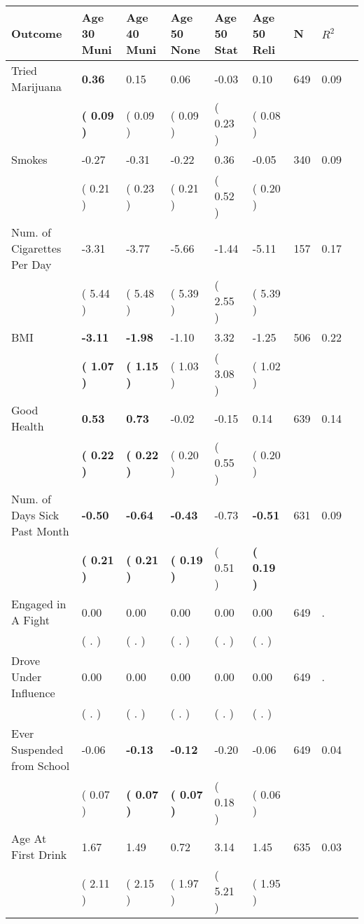 \begin{tabular}{L{6.2cm} C{1.8cm} C{1.8cm} C{1.8cm} C{1.8cm} C{1.8cm} C{1.8cm} C{0.3cm} C{0.3cm}}
\toprule
 \textbf{Outcome} & \textbf{Age 30 Muni} & \textbf{Age 40 Muni} & \textbf{Age 50 None} & \textbf{Age 50 Stat} & \textbf{Age 50 Reli} & \textbf{N} & \textbf{$ R^2$} \\
\midrule
Tried Marijuana & \textbf{     0.36} &      0.15 &      0.06 &     -0.03 &      0.10  & 649 &       0.09 \\ 
 & \textbf{(     0.09 )} & (     0.09 ) & (     0.09 ) & (     0.23 ) & (     0.08 )  & \\
Smokes &     -0.27 &     -0.31 &     -0.22 &      0.36 &     -0.05  & 340 &       0.09 \\ 
 & (     0.21 ) & (     0.23 ) & (     0.21 ) & (     0.52 ) & (     0.20 )  & \\
Num. of Cigarettes Per Day &     -3.31 &     -3.77 &     -5.66 &     -1.44 &     -5.11  & 157 &       0.17 \\ 
 & (     5.44 ) & (     5.48 ) & (     5.39 ) & (     2.55 ) & (     5.39 )  & \\
BMI & \textbf{    -3.11} & \textbf{    -1.98} &     -1.10 &      3.32 &     -1.25  & 506 &       0.22 \\ 
 & \textbf{(     1.07 )} & \textbf{(     1.15 )} & (     1.03 ) & (     3.08 ) & (     1.02 )  & \\
Good Health & \textbf{     0.53} & \textbf{     0.73} &     -0.02 &     -0.15 &      0.14  & 639 &       0.14 \\ 
 & \textbf{(     0.22 )} & \textbf{(     0.22 )} & (     0.20 ) & (     0.55 ) & (     0.20 )  & \\
Num. of Days Sick Past Month & \textbf{    -0.50} & \textbf{    -0.64} & \textbf{    -0.43} &     -0.73 & \textbf{    -0.51}  & 631 &       0.09 \\ 
 & \textbf{(     0.21 )} & \textbf{(     0.21 )} & \textbf{(     0.19 )} & (     0.51 ) & \textbf{(     0.19 )}  & \\
Engaged in A Fight &      0.00 &      0.00 &      0.00 &      0.00 &      0.00  & 649 &          . \\ 
 & (        . ) & (        . ) & (        . ) & (        . ) & (        . )  & \\
Drove Under Influence &      0.00 &      0.00 &      0.00 &      0.00 &      0.00  & 649 &          . \\ 
 & (        . ) & (        . ) & (        . ) & (        . ) & (        . )  & \\
Ever Suspended from School &     -0.06 & \textbf{    -0.13} & \textbf{    -0.12} &     -0.20 &     -0.06  & 649 &       0.04 \\ 
 & (     0.07 ) & \textbf{(     0.07 )} & \textbf{(     0.07 )} & (     0.18 ) & (     0.06 )  & \\
Age At First Drink &      1.67 &      1.49 &      0.72 &      3.14 &      1.45  & 635 &       0.03 \\ 
 & (     2.11 ) & (     2.15 ) & (     1.97 ) & (     5.21 ) & (     1.95 )  & \\
\bottomrule
\end{tabular}
